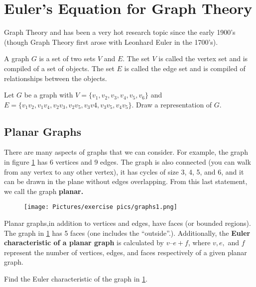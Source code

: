 
\section{Euler's Equation for Graph Theory}

Graph Theory and has been a very hot research topic since the early 1900’s (though Graph Theory first arose with Leonhard Euler in the 1700’s).

\noindent A graph $G$ is a set of two sets $V$ and $E$. The set $V$ is called the vertex set and is compiled of a set of objects. The set $E$ is called the edge set and is compiled of relationships between the objects.

\begin{exercise}
Let $G$ be a graph with $V = \{v_1,v_2,v_3,v_4,v_5,v_6\}$ and $E = \{v_1v_2, v_1v_4, v_2v_3, v_2v_5, v_3v4, v_3v_5, v_4v_5\}$. Draw a representation of $G$.
\end{exercise}

\vspace{2in}

\subsection{Planar Graphs}

There are many aspects of graphs that we can consider. For example, the graph in figure \ref{graph1} has 6 vertices and 9 edges. The graph is also connected (you can walk from any vertex to any other vertex), it has cycles of size 3, 4, 5, and 6, and it can be drawn in the plane without edges overlapping. From this last statement, we call the graph \textbf{planar.} 

\begin{figure}[h]
    \centering
    \texttt{[image: Pictures/exercise pics/graphs1.png]}
    \label{graph1}
\end{figure}

\noindent Planar graphs,in addition to vertices and edges, have faces (or bounded regions). The graph in \ref{graph1} has 5 faces (one includes the “outside”.). Additionally, the \textbf{Euler characteristic of a planar graph} is calculated by $v – e + f$, where $v, e,$ and $f$ represent the number of vertices, edges, and faces respectively of a given planar graph.

\begin{exercise}
Find the Euler characteristic of the graph in \ref{graph1}.
\end{exercise}

